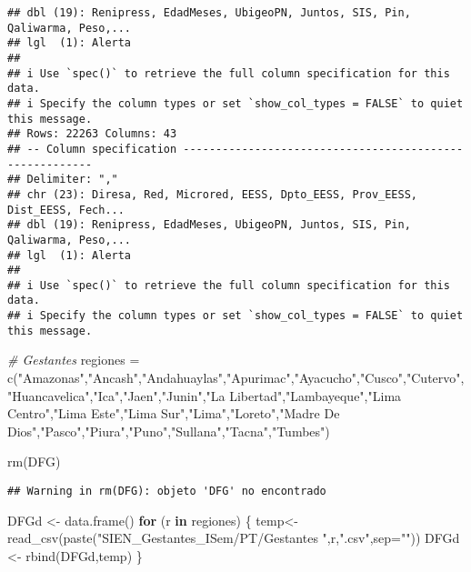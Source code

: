 \documentclass[
]{article}
\newenvironment{Shaded}{\begin{snugshade}}{\end{snugshade}}
\newcommand{\AttributeTok}[1]{\textcolor[rgb]{0.77,0.63,0.00}{#1}}
\newcommand{\CommentTok}[1]{\textcolor[rgb]{0.56,0.35,0.01}{\textit{#1}}}
\newcommand{\ControlFlowTok}[1]{\textcolor[rgb]{0.13,0.29,0.53}{\textbf{#1}}}
\newcommand{\FunctionTok}[1]{\textcolor[rgb]{0.00,0.00,0.00}{#1}}
\newcommand{\NormalTok}[1]{#1}
\newcommand{\OtherTok}[1]{\textcolor[rgb]{0.56,0.35,0.01}{#1}}
\newcommand{\StringTok}[1]{\textcolor[rgb]{0.31,0.60,0.02}{#1}}
\begin{document}
\begin{verbatim}
## dbl (19): Renipress, EdadMeses, UbigeoPN, Juntos, SIS, Pin, Qaliwarma, Peso,...
## lgl  (1): Alerta
## 
## i Use `spec()` to retrieve the full column specification for this data.
## i Specify the column types or set `show_col_types = FALSE` to quiet this message.
## Rows: 22263 Columns: 43
## -- Column specification --------------------------------------------------------
## Delimiter: ","
## chr (23): Diresa, Red, Microred, EESS, Dpto_EESS, Prov_EESS, Dist_EESS, Fech...
## dbl (19): Renipress, EdadMeses, UbigeoPN, Juntos, SIS, Pin, Qaliwarma, Peso,...
## lgl  (1): Alerta
## 
## i Use `spec()` to retrieve the full column specification for this data.
## i Specify the column types or set `show_col_types = FALSE` to quiet this message.
\end{verbatim}

\begin{Shaded}
\begin{Highlighting}[]
\CommentTok{\# Gestantes }
\NormalTok{regiones }\OtherTok{=} \FunctionTok{c}\NormalTok{(}\StringTok{"Amazonas"}\NormalTok{,}\StringTok{"Ancash"}\NormalTok{,}\StringTok{"Andahuaylas"}\NormalTok{,}\StringTok{"Apurimac"}\NormalTok{,}\StringTok{"Ayacucho"}\NormalTok{,}\StringTok{"Cusco"}\NormalTok{,}\StringTok{"Cutervo"}\NormalTok{,}\StringTok{"Huancavelica"}\NormalTok{,}\StringTok{"Ica"}\NormalTok{,}\StringTok{"Jaen"}\NormalTok{,}\StringTok{"Junin"}\NormalTok{,}\StringTok{"La Libertad"}\NormalTok{,}\StringTok{"Lambayeque"}\NormalTok{,}\StringTok{"Lima Centro"}\NormalTok{,}\StringTok{"Lima Este"}\NormalTok{,}\StringTok{"Lima Sur"}\NormalTok{,}\StringTok{"Lima"}\NormalTok{,}\StringTok{"Loreto"}\NormalTok{,}\StringTok{"Madre De Dios"}\NormalTok{,}\StringTok{"Pasco"}\NormalTok{,}\StringTok{"Piura"}\NormalTok{,}\StringTok{"Puno"}\NormalTok{,}\StringTok{"Sullana"}\NormalTok{,}\StringTok{"Tacna"}\NormalTok{,}\StringTok{"Tumbes"}\NormalTok{)}

\FunctionTok{rm}\NormalTok{(DFG)}
\end{Highlighting}
\end{Shaded}

\begin{verbatim}
## Warning in rm(DFG): objeto 'DFG' no encontrado
\end{verbatim}

\begin{Shaded}
\begin{Highlighting}[]
\NormalTok{DFGd }\OtherTok{\textless{}{-}} \FunctionTok{data.frame}\NormalTok{()}
\ControlFlowTok{for}\NormalTok{ (r }\ControlFlowTok{in}\NormalTok{ regiones) \{}
\NormalTok{  temp}\OtherTok{\textless{}{-}} \FunctionTok{read\_csv}\NormalTok{(}\FunctionTok{paste}\NormalTok{(}\StringTok{"SIEN\_Gestantes\_ISem/PT/Gestantes "}\NormalTok{,r,}\StringTok{".csv"}\NormalTok{,}\AttributeTok{sep=}\StringTok{""}\NormalTok{))}
\NormalTok{  DFGd }\OtherTok{\textless{}{-}} \FunctionTok{rbind}\NormalTok{(DFGd,temp)}
\NormalTok{\}}
\end{Highlighting}
\end{Shaded}
\end{document}
